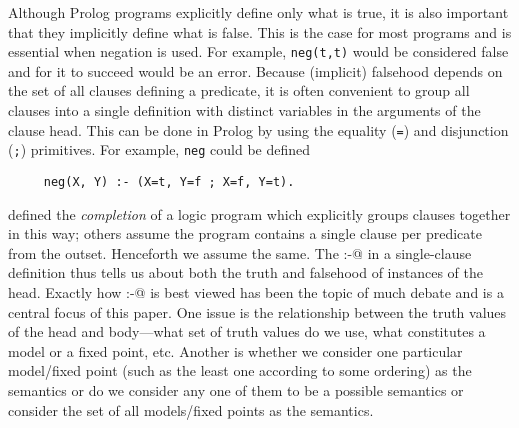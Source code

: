 \documentclass{tlp}
\begin{document}
Although Prolog programs explicitly define only what is true, it is also
important that they implicitly define what is false.  This is the case
for most programs and is essential when negation is used.  For example,
\texttt{neg(t,t)} would be considered false and for it to succeed would
be an error.  Because (implicit) falsehood depends on the set of all
clauses defining a predicate, it is often convenient to group all
clauses into a single definition with distinct variables in the
arguments of the clause head.  This can be done in Prolog by using the
equality (\texttt{=}) and disjunction (\texttt{;}) primitives.  For
example, \texttt{neg} could be defined 
\begin{verbatim}
     neg(X, Y) :- (X=t, Y=f ; X=f, Y=t).
\end{verbatim}
defined the \emph{completion} of a logic program which explicitly
groups clauses together in this way; others 
\cite{fitting:JLP_1991,sem3neg} assume
the program contains a single clause per predicate from the outset.
Henceforth we assume the same.  
The \verb@:-@ in a single-clause definition thus tells us about 
both the truth and falsehood of instances of the head.
Exactly how \verb@:-@ is best viewed has been the topic of much debate
and is a central focus of this paper.  One issue is the relationship
between the truth values of the head and body---what set of truth
values do we use, what constitutes a model or a fixed point, etc.
Another is whether we consider one particular model/fixed point (such
as the least one according to some ordering) as the semantics or do we
consider any one of them to be a possible semantics or consider the set
of all models/fixed points as the semantics.
\end{document}
